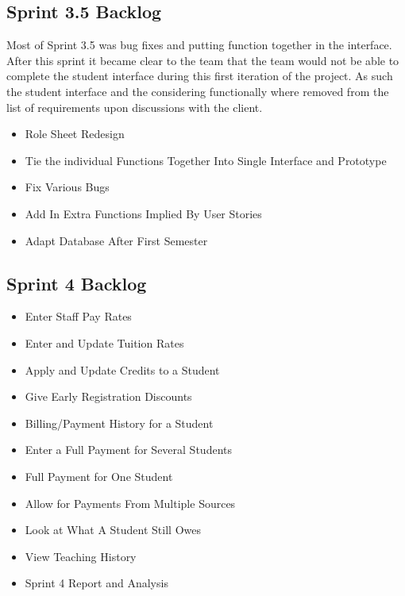 \subsection{Sprint 3.5 Backlog}
Most of Sprint 3.5 was bug fixes and putting function together in the interface. After this sprint it became clear to the team that the team would not be able to complete the student interface during this first iteration of the project. As such the student interface and the considering functionally where removed from the list of requirements upon discussions with the client.

\begin{itemize}
\item Role Sheet Redesign 
\item Tie the individual Functions Together Into Single Interface and Prototype 
\item Fix Various Bugs
\item Add In Extra Functions Implied By User Stories
\item Adapt Database After First Semester 
\end{itemize}

\subsection{Sprint 4 Backlog}
\begin{itemize}
\item Enter Staff Pay Rates
\item Enter and Update Tuition Rates
\item Apply and Update Credits to a Student
\item Give Early Registration Discounts
\item Billing/Payment History for a Student
\item Enter a Full Payment for Several Students
\item Full Payment for One Student
\item Allow for Payments From Multiple Sources 
\item Look at What A Student Still Owes
\item View Teaching History
\item Sprint 4 Report and Analysis 
\end{itemize}

